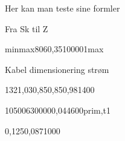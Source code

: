 \documentclass[a4paper,oneside,10pt,danish]{report}
\begin{document}
Her kan man teste sine formler

 
Fra Sk til Z
\begin{FraSkTilZ}{min}{max}{80}{6}{0,35}{10000}{1}{max}
\end{FraSkTilZ}

Kabel dimensionering strøm
\begin{Iz,min}{132}{1,03}{0,85}{0,85}{0,98}{1}{400}
\end{Iz,min}

\begin{Ztrafo}{10500}{630000}{0,04}{4600}{prim,t1}
\end{Ztrafo}

\begin{Zkabel}{1}{0,125}{0,087}{1000}
\end{Zkabel}
\end{document}
